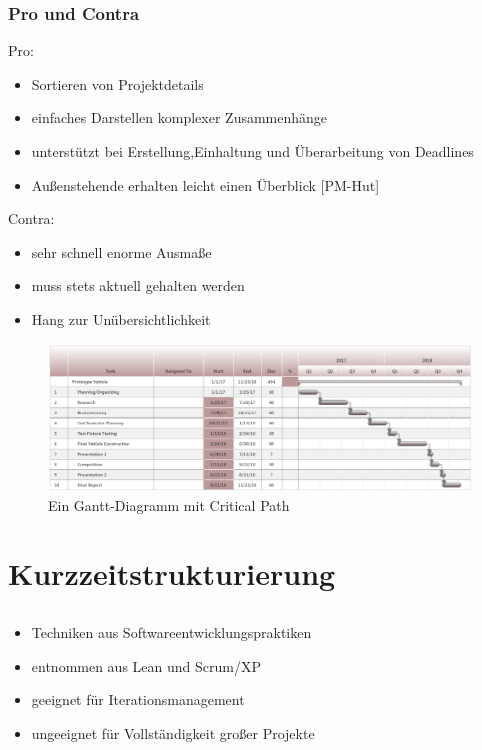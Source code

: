 \documentclass[%
	handout
]{beamer}
\newcommand{\pmhut}{[PM-Hut]}
\begin{document}
		\begin{frame}
			\frametitle{Pro und Contra}
			\begin{minipage}[t]{.48\textwidth}
				Pro:
				\begin{itemize}
					\item Sortieren von Projektdetails
					\item einfaches Darstellen komplexer Zusammenhänge
					\item unterstützt bei Erstellung,Einhaltung und Überarbeitung von Deadlines
					\item Außenstehende erhalten leicht einen Überblick \pmhut
				\end{itemize}
			\end{minipage}
			\begin{minipage}[t]{.48\textwidth}
				Contra:
				\begin{itemize}
					\item sehr schnell enorme Ausmaße
					\item muss stets aktuell gehalten werden
					\item Hang zur Unübersichtlichkeit
				\end{itemize}
			\end{minipage}
		\end{frame}
		
		\begin{frame}
			\begin{figure}
				\begin{center}
					\includegraphics[scale=.3]{../images/gantt2.png}
					\caption{Ein Gantt-Diagramm mit Critical Path}
					\label{img:gantt}
				\end{center}
			\end{figure}
		\end{frame}
		
\section{Kurzzeitstrukturierung}
	\subsection{}
		\begin{frame}
			\begin{itemize}
				\item Techniken aus Softwareentwicklungspraktiken
				\item entnommen aus Lean und Scrum/XP
				\item geeignet für Iterationsmanagement
				\item ungeeignet für Vollständigkeit großer Projekte
			\end{itemize}
		\end{frame}
\end{document}
